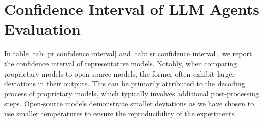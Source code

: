 \section{Confidence Interval of LLM Agents Evaluation\label{appendix: error bar}}

In table \ref{tab: pr confidence interval} and \ref{tab: sr confidence interval}, we report the confidence interval of representative models. Notably, when comparing proprietary models to open-source models, the former often exhibit larger deviations in their outputs. This can be primarily attributed to the decoding process of proprietary models, which typically involves additional post-processing steps. Open-source models demonstrate smaller deviations as we have chosen to use smaller temperatures to ensure the reproducibility of the experiments.




